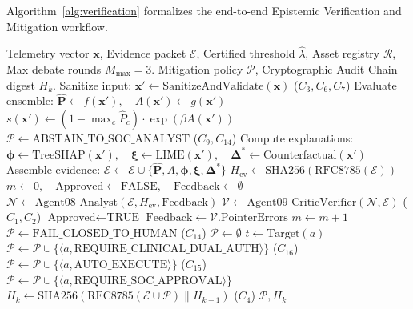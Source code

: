\documentclass{ieeeaccess}
\begin{document}
Algorithm~\ref{alg:verification} formalizes the end-to-end Epistemic Verification and Mitigation workflow.

\begin{algorithm}[t]
\caption{Game-Theoretic Epistemic Verification \& Invariant Enforcement}
\label{alg:verification}
\begin{algorithmic}[1]
\REQUIRE Telemetry vector $\mathbf{x}$, Evidence packet $\mathcal{E}$, Certified threshold $\hat{\lambda}$, Asset registry $\mathcal{R}$, Max debate rounds $M_{\max} = 3$.
\ENSURE Mitigation policy $\mathcal{P}$, Cryptographic Audit Chain digest $H_k$.
\STATE Sanitize input: $\mathbf{x}' \leftarrow \text{SanitizeAndValidate}(\mathbf{x})$ ($C_3, C_6, C_7$)
\STATE Evaluate ensemble: $\hat{\mathbf{P}} \leftarrow f(\mathbf{x}'), \quad A(\mathbf{x}') \leftarrow g(\mathbf{x}')$
\STATE $s(\mathbf{x}') \leftarrow (1 - \max_c \hat{P}_c) \cdot \exp(\beta A(\mathbf{x}'))$
    \RETURN $\mathcal{P} \leftarrow \text{ABSTAIN\_TO\_SOC\_ANALYST}$ ($C_9, C_{14}$)
\ENDIF
\STATE Compute explanations: $\boldsymbol{\phi} \leftarrow \text{TreeSHAP}(\mathbf{x}'), \quad \boldsymbol{\xi} \leftarrow \text{LIME}(\mathbf{x}'), \quad \boldsymbol{\Delta}^* \leftarrow \text{Counterfactual}(\mathbf{x}')$
\STATE Assemble evidence: $\mathcal{E} \leftarrow \mathcal{E} \cup \{\hat{\mathbf{P}}, A, \boldsymbol{\phi}, \boldsymbol{\xi}, \boldsymbol{\Delta}^*\}$
\STATE $H_{\text{ev}} \leftarrow \text{SHA256}(\text{RFC8785}(\mathcal{E}))$ 
\STATE $m \leftarrow 0, \quad \text{Approved} \leftarrow \text{FALSE}, \quad \text{Feedback} \leftarrow \emptyset$
    \STATE $\mathcal{N} \leftarrow \text{Agent08\_Analyst}(\mathcal{E}, H_{\text{ev}}, \text{Feedback})$
    \STATE $\mathcal{V} \leftarrow \text{Agent09\_CriticVerifier}(\mathcal{N}, \mathcal{E})$ ($C_1, C_2$)
        \STATE $\text{Approved} \leftarrow \text{TRUE}$
    \ELSE
        \STATE $\text{Feedback} \leftarrow \mathcal{V}.\text{PointerErrors}$
        \STATE $m \leftarrow m + 1$
    \ENDIF
\ENDWHILE
{}
    \RETURN $\mathcal{P} \leftarrow \text{FAIL\_CLOSED\_TO\_HUMAN}$ ($C_{14}$)
\ENDIF
\STATE $\mathcal{P} \leftarrow \emptyset$
    \STATE $t \leftarrow \text{Target}(a)$
        \STATE $\mathcal{P} \leftarrow \mathcal{P} \cup \{\langle a, \text{REQUIRE\_CLINICAL\_DUAL\_AUTH}\rangle\}$ ($C_{16}$)
        \STATE $\mathcal{P} \leftarrow \mathcal{P} \cup \{\langle a, \text{AUTO\_EXECUTE}\rangle\}$ ($C_{15}$)
    \ELSE
        \STATE $\mathcal{P} \leftarrow \mathcal{P} \cup \{\langle a, \text{REQUIRE\_SOC\_APPROVAL}\rangle\}$
    \ENDIF
\ENDFOR
\STATE $H_k \leftarrow \text{SHA256}(\text{RFC8785}(\mathcal{E} \cup \mathcal{P}) \parallel H_{k-1})$ ($C_4$)
\RETURN $\mathcal{P}, H_k$
\end{algorithmic}
\end{algorithm}
\end{document}
